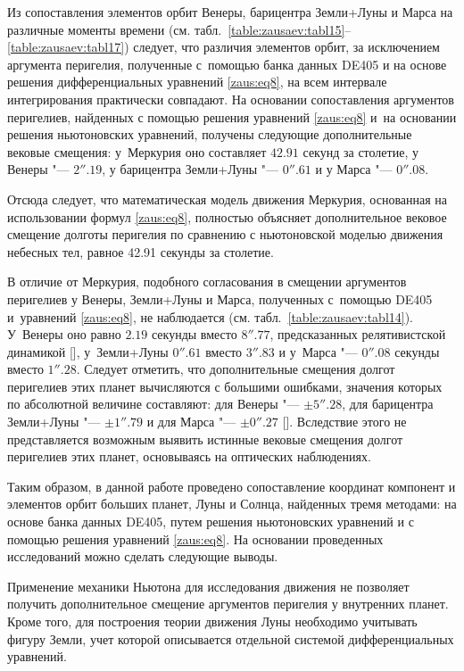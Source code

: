 Из сопоставления элементов орбит Венеры, барицентра Земли+Луны \linebreak и Марса на различные моменты времени (см. табл.~\ref{table:zausaev:tabl15}--\ref{table:zausaev:tabl17}) следует, что различия  элементов орбит, за исключением аргумента перигелия, полученные с~помощью банка данных DE405  и на основе решения дифференциальных уравнений \eqref{zaus:eq8}, на всем интервале интегрирования практически совпадают. 
На основании сопоставления аргументов перигелиев, найденных с помощью решения уравнений \eqref{zaus:eq8}  и~на основании решения ньютоновских уравнений, получены следующие дополнительные вековые смещения: 
у~Меркурия оно составляет $42.91$ секунд за столетие, у Венеры "--- $2''.19$, у барицентра Земли+Луны "--- $0''.61$  и у Марса "--- $0''.08$.

Отсюда следует, что математическая модель движения Меркурия, основанная на использовании формул \eqref{zaus:eq8}, полностью объясняет дополнительное вековое смещение долготы перигелия по сравнению с ньютоновской моделью движения небесных тел, равное 42.91 секунды за столетие.




В отличие от Меркурия, подобного согласования в смещении аргументов перигелиев у Венеры, Земли+Луны и Марса, полученных с~помощью DE405 и~уравнений \eqref{zaus:eq8},  не наблюдается (см. табл.~\ref{table:zausaev:tabl14}). 
У~Венеры оно равно $2.19$ секунды вместо $8''.77$, предсказанных релятивистской динамикой [], у~Земли+Луны $0''.61$ вместо $3''.83$ и у~Марса "--- $0''.08$ секунды вместо $1''.28$. 
Следует отметить, что дополнительные смещения долгот перигелиев этих планет вычисляются с большими ошибками, значения которых по абсолютной  величине составляют: 
для Венеры "--- $\pm 5''.28$, для барицентра Земли+Луны "--- $\pm 1''.79$ и для Марса "--- $\pm 0''.27$ []. Вследствие этого не представляется возможным выявить истинные вековые смещения долгот перигелиев этих планет, основываясь на оптических наблюдениях.

Таким образом, в данной работе проведено сопоставление координат компонент и элементов орбит больших планет, Луны и Солнца, найденных тремя методами: на основе банка данных DE405, путем решения ньютоновских уравнений и с помощью решения уравнений \eqref{zaus:eq8}. 
На основании проведенных исследований можно сделать следующие выводы.

Применение механики Ньютона для исследования движения не позволяет получить дополнительное смещение аргументов перигелия у внутренних планет. Кроме того, для построения теории движения Луны необходимо учитывать фигуру Земли, учет которой описывается отдельной системой дифференциальных уравнений.

